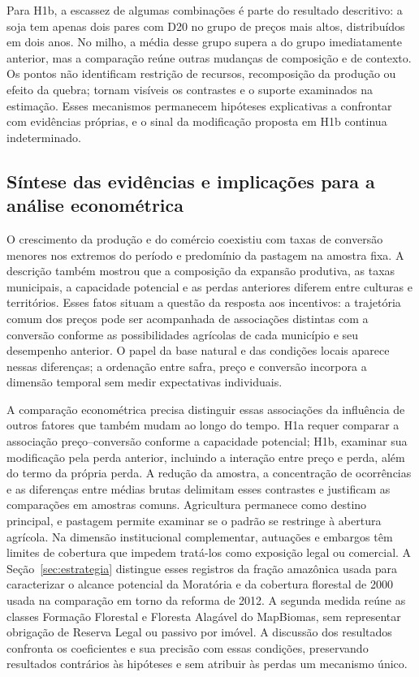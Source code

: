 Para H1b, a escassez de algumas combinações é parte do resultado descritivo: a soja tem apenas dois pares com D20 no grupo de preços mais altos, distribuídos em dois anos. No milho, a média desse grupo supera a do grupo imediatamente anterior, mas a comparação reúne outras mudanças de composição e de contexto. Os pontos não identificam restrição de recursos, recomposição da produção ou efeito da quebra; tornam visíveis os contrastes e o suporte examinados na estimação. Esses mecanismos permanecem hipóteses explicativas a confrontar com evidências próprias, e o sinal da modificação proposta em H1b continua indeterminado.

\subsection{Síntese das evidências e implicações para a análise econométrica}
\label{descritiva-sintese}

O crescimento da produção e do comércio coexistiu com taxas de conversão menores nos extremos do período e predomínio da pastagem na amostra fixa. A descrição também mostrou que a composição da expansão produtiva, as taxas municipais, a capacidade potencial e as perdas anteriores diferem entre culturas e territórios. Esses fatos situam a questão da resposta aos incentivos: a trajetória comum dos preços pode ser acompanhada de associações distintas com a conversão conforme as possibilidades agrícolas de cada município e seu desempenho anterior. O papel da base natural e das condições locais aparece nessas diferenças; a ordenação entre safra, preço e conversão incorpora a dimensão temporal sem medir expectativas individuais.

A comparação econométrica precisa distinguir essas associações da influência de outros fatores que também mudam ao longo do tempo. H1a requer comparar a associação preço--conversão conforme a capacidade potencial; H1b, examinar sua modificação pela perda anterior, incluindo a interação entre preço e perda, além do termo da própria perda. A redução da amostra, a concentração de ocorrências e as diferenças entre médias brutas delimitam esses contrastes e justificam as comparações em amostras comuns. Agricultura permanece como destino principal, e pastagem permite examinar se o padrão se restringe à abertura agrícola. Na dimensão institucional complementar, autuações e embargos têm limites de cobertura que impedem tratá-los como exposição legal ou comercial. A Seção~\ref{sec:estrategia} distingue esses registros da fração amazônica usada para caracterizar o alcance potencial da Moratória e da cobertura florestal de 2000 usada na comparação em torno da reforma de 2012. A segunda medida reúne as classes Formação Florestal e Floresta Alagável do MapBiomas, sem representar obrigação de Reserva Legal ou passivo por imóvel. A discussão dos resultados confronta os coeficientes e sua precisão com essas condições, preservando resultados contrários às hipóteses e sem atribuir às perdas um mecanismo único.

